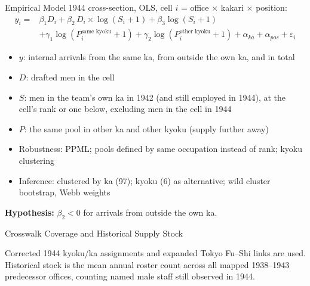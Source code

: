\documentclass{beamer}
\begin{document}
\begin{frame}{Empirical Model}
\small
1944 cross-section, OLS, cell $i$ = office $\times$ kakari $\times$ position:
\begin{align*}
y_i = {}& \beta_1 D_i + \beta_2\, D_i \times \log(S_i + 1) + \beta_3 \log(S_i + 1) \\
& + \gamma_1 \log(P^{\text{same kyoku}}_i + 1) + \gamma_2 \log(P^{\text{other kyoku}}_i + 1)
+ \alpha_{ka} + \alpha_{pos} + \varepsilon_i
\end{align*}
\vspace{-0.5em}
\begin{itemize}
\item $y$: internal arrivals from the same ka, from outside the own ka, and in total
\item $D$: drafted men in the cell
\item $S$: men in the team's own ka in 1942 (and still employed in 1944), at the cell's rank or one below, excluding men in the cell in 1944
\item $P$: the same pool in other ka and other kyoku (supply further away)
\item Robustness: PPML; pools defined by same occupation instead of rank; kyoku clustering
\item Inference: clustered by ka (97); kyoku (6) as alternative; wild cluster bootstrap, Webb weights
\end{itemize}
\medskip
\textbf{Hypothesis:} $\beta_2<0$ for arrivals from outside the own ka.
\end{frame}
\begin{frame}{Crosswalk Coverage and Historical Supply Stock}
\centering
{}
\vspace{0.4em}
\parbox{0.96\textwidth}{\centering\scriptsize Corrected 1944 kyoku/ka assignments and expanded Tokyo Fu--Shi links are used. Historical stock is the mean annual roster count across all mapped 1938--1943 predecessor offices, counting named male staff still observed in 1944.}
\end{frame}
\end{document}
